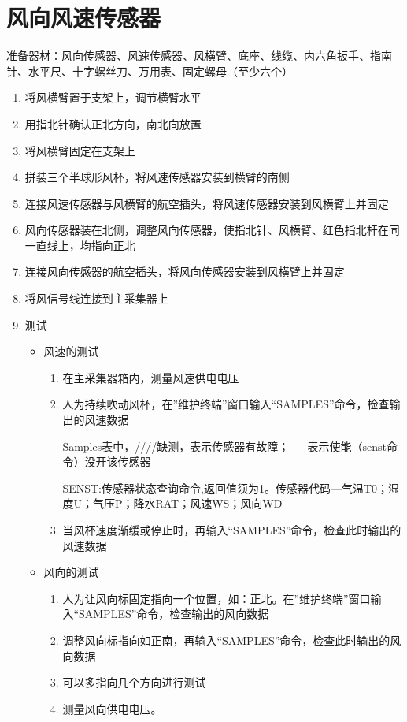 ﻿\documentclass[UTF8,11pt]{ctexbook}%
\begin{document}
\section{风向风速传感器}

准备器材：风向传感器、风速传感器、风横臂、底座、线缆、内六角扳手、指南针、水平尺、十字螺丝刀、万用表、固定螺母（至少六个）
\begin{enumerate}
	\item 将风横臂置于支架上，调节横臂水平
	\item 用指北针确认正北方向，南北向放置
	\item 将风横臂固定在支架上
	\item 拼装三个半球形风杯，将风速传感器安装到横臂的南侧
	\item 连接风速传感器与风横臂的航空插头，将风速传感器安装到风横臂上并固定
	\item 风向传感器装在北侧，调整风向传感器，使指北针、风横臂、红色指北杆在同一直线上，均指向正北
	\item 连接风向传感器的航空插头，将风向传感器安装到风横臂上并固定
	\item 将风信号线连接到主采集器上
	\item 测试\begin{itemize}
		\item 风速的测试\begin{enumerate}
			\item 在主采集器箱内，测量风速供电电压
			\item 人为持续吹动风杯，在”维护终端”窗口输入“SAMPLES”命令，检查输出的风速数据\par\qquad
			Samples表中，////缺测，表示传感器有故障；---- 表示使能（senst命令）没开该传感器\par\qquad
			SENST:传感器状态查询命令,返回值须为1。传感器代码---气温T0；湿度U；气压P；降水RAT；风速WS；风向WD
			\item 当风杯速度渐缓或停止时，再输入“SAMPLES”命令，检查此时输出的风速数据
		\end{enumerate}
		\item 风向的测试\begin{enumerate}
			\item 人为让风向标固定指向一个位置，如：正北。在”维护终端”窗口输入“SAMPLES”命令，检查输出的风向数据
			\item 调整风向标指向如正南，再输入“SAMPLES”命令，检查此时输出的风向数据
			\item 可以多指向几个方向进行测试
			\item 测量风向供电电压。
		\end{enumerate}
	\end{itemize}
\end{enumerate}
\end{document}
